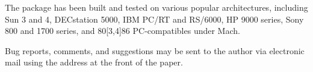 The package has been built and tested on various popular architectures,
including Sun 3 and 4, DECstation 5000, IBM PC/RT and RS/6000, HP 9000 series,
Sony 800 and 1700 series, and 80[3,4]86 PC-compatibles under Mach.

Bug reports, comments, and suggestions may be sent to the author via
electronic mail using the address at the front of the paper.


